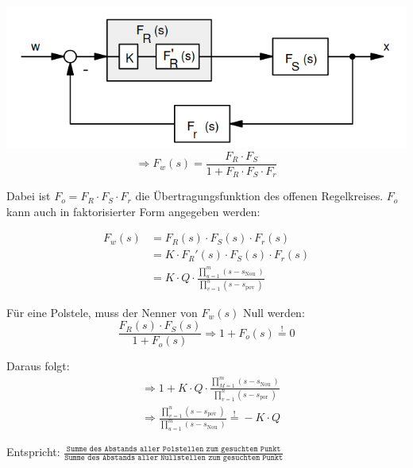 \documentclass[10pt,a4paper]{article}
\begin{document}
\includegraphics[width=0.94\columnwidth]{Figures/WOKkreis.png}
\[
	\Rightarrow F_w (s)= \dfrac {F_R \cdot F_S} {1+F_R \cdot F_S \cdot F_r}
\]

\begin{mdframed}[style=exercise]
	Dabei ist $F_o = F_R \cdot F_S \cdot F_r$ die Übertragungsfunktion des
	offenen Regelkreises. $F_o$ kann auch in faktorisierter Form angegeben
	werden:
\end{mdframed}

\begin{align*}
	F_w (s) & = F_R (s) \cdot F_S (s) \cdot F_r (s)
	\\ & =K \cdot F_R '(s) \cdot F_S (s) \cdot F_r (s)
	\\ & =K \cdot Q \cdot \frac{\prod_{u=1}^{m}\left(s-s_{\text {Nou
			}}\right)}{\prod_{v=1}^{n}\left(s-s_{\text {pov }}\right)}
\end{align*}

Für eine Polstele, muss der Nenner von $F_w (s)$ Null werden:
\[
    \dfrac{F_R (s) \cdot F_S (s)}{1+F_o (s)} \Rightarrow 1+F_o (s) \stackrel{!}{=}0
\]

Daraus folgt:
\begin{align*}
	 & \Rightarrow 1+ K \cdot Q \cdot \frac{\prod_{M=1}^{m}\left(s-s_{\text {Nou }}\right)}{\prod_{v=1}^{n}\left(s-s_{\text {por }}\right)}         \\
	 & \Rightarrow \frac{\prod_{v=1}^{n}\left(s-s_{\text {pov }}\right)}{\prod_{u=1}^{m}\left(s-s_{\text {Nou }}\right)} \stackrel{!}{=} -K \cdot Q
\end{align*}

Entspricht: $\frac{\texttt{Summe des Abstands aller Polstellen zum gesuchtem Punkt}}{\texttt{Summe des Abstands aller Nullstellen zum gesuchtem Punkt}}$
\end{document}
